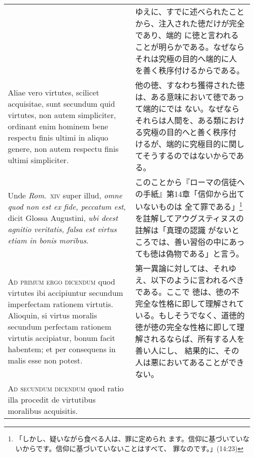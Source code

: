 \documentclass[10pt]{jsarticle}
\begin{document}
\begin{longtable}{p{21em}p{21em}}
&

 ゆえに、すでに述べられたことから、注入された徳だけが完全であり、端的
 に徳と言われることが明らかである。なぜならそれは究極の目的へ端的に人
 を善く秩序付けるからである。

\\

 Aliae vero virtutes, scilicet acquisitae, sunt secundum quid
 virtutes, non autem simpliciter, ordinant enim hominem bene respectu
 finis ultimi in aliquo genere, non autem respectu finis ultimi
 simpliciter.
 
&

 他の徳、すなわち獲得された徳は、ある意味において徳であって端的にでは
 ない。なぜならそれらは人間を、ある類における究極の目的へと善く秩序付
 けるが、端的に究極目的に関してそうするのではないからである。

\\




 Unde {\itshape Rom}.~{\scshape xiv} super illud, {\itshape omne quod
 non est ex fide, peccatum est}, dicit Glossa Augustini, {\itshape ubi
 deest agnitio veritatis, falsa est virtus etiam in bonis moribus}.
 
&

 このことから『ローマの信徒への手紙』第14章「信仰から出ていないものは
 全て罪である」\footnote{「しかし、疑いながら食べる人は、罪に定められ
 ます。信仰に基づいていないからです。信仰に基づいていないことはすべて、
 罪なのです。」(14:23)}を註解してアウグスティヌスの註解は「真理の認識
 がないところでは、善い習俗の中にあっても徳は偽物である」と言う。

\\

 {\scshape Ad primum ergo dicendum} quod virtutes ibi accipiuntur
 secundum imperfectam rationem virtutis. Alioquin, si virtus moralis
 secundum perfectam rationem virtutis accipiatur, bonum facit
 habentem; et per consequens in malis esse non potest.
 
&

 第一異論に対しては、それゆえ、以下のように言われるべきである。ここで
 徳は、徳の不完全な性格に即して理解されている。もしそうでなく、道徳的
 徳が徳の完全な性格に即して理解されるならば、所有する人を善い人にし、
 結果的に、その人は悪においてあることができない。

\\



 {\scshape Ad secundum dicendum} quod ratio illa procedit de
 virtutibus moralibus acquisitis.


\end{longtable}
\end{document}
